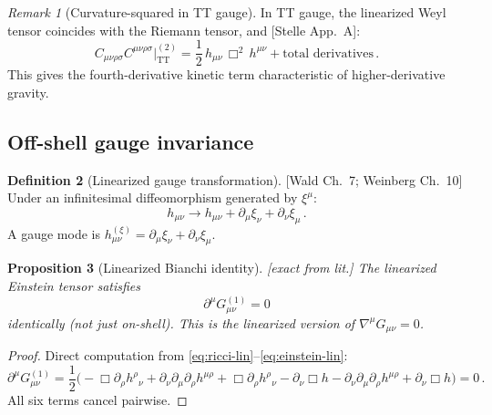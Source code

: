 \documentclass[12pt,a4paper]{article}
\newtheorem{proposition}{Proposition}[section]
\theoremstyle{definition}
\newtheorem{definition}[proposition]{Definition}
\theoremstyle{remark}
\newtheorem{remark}[proposition]{Remark}
\newcommand{\Weylsq}{C_{\mu\nu\rho\sigma}C^{\mu\nu\rho\sigma}}
\newcommand{\fromlit}[1]{\textcolor{blue!70!black}{\textsf{[#1]}}}
\newcommand{\exactlit}{\textcolor{blue!60!black}{\textsf{[exact from lit.]}}}
\begin{document}
\begin{remark}[Curvature-squared in TT gauge]
In TT gauge, the linearized Weyl tensor coincides with the Riemann
tensor, and \fromlit{Stelle App.~A}:
\begin{equation}
  \Weylsq\big|_{\text{TT}}^{(2)}
  = \frac{1}{2}\,h_{\mu\nu}\,\Box^2\, h^{\mu\nu}
  + \text{total derivatives}\,.
  \label{eq:weyl-sq-tt}
\end{equation}
This gives the fourth-derivative kinetic term characteristic of
higher-derivative gravity.
\end{remark}


\subsection{Off-shell gauge invariance}

\begin{definition}[Linearized gauge transformation]
\label{def:gauge-transf}
\fromlit{Wald Ch.~7; Weinberg Ch.~10}
Under an infinitesimal diffeomorphism generated by $\xi^\mu$:
\begin{equation}
  h_{\mu\nu} \to h_{\mu\nu} + \partial_\mu\xi_\nu
  + \partial_\nu\xi_\mu\,.
  \label{eq:gauge-transf}
\end{equation}
A gauge mode is $h_{\mu\nu}^{(\xi)} = \partial_\mu\xi_\nu
+ \partial_\nu\xi_\mu$.
\end{definition}

\begin{proposition}[Linearized Bianchi identity]
\label{prop:bianchi}
\exactlit\;
The linearized Einstein tensor satisfies
\begin{equation}
  \partial^\mu G_{\mu\nu}^{(1)} = 0
  \label{eq:bianchi}
\end{equation}
identically (not just on-shell).  This is the linearized version
of $\nabla^\mu G_{\mu\nu} = 0$.
\end{proposition}
\begin{proof}
Direct computation from \eqref{eq:ricci-lin}--\eqref{eq:einstein-lin}:
\begin{equation}
  \partial^\mu G_{\mu\nu}^{(1)}
  = \frac{1}{2}\bigl(
    -\Box\partial_\rho h^\rho{}_\nu
    + \partial_\nu\partial_\mu\partial_\rho h^{\mu\rho}
    + \Box\partial_\rho h^\rho{}_\nu
    - \partial_\nu\Box h
    - \partial_\nu\partial_\mu\partial_\rho h^{\mu\rho}
    + \partial_\nu\Box h
  \bigr) = 0\,.
\end{equation}
All six terms cancel pairwise.
\end{proof}
\end{document}
